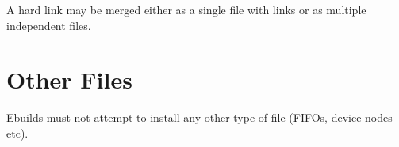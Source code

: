 A hard link may be merged either as a single file with links or as multiple independent files.

\section{Other Files}

Ebuilds must not attempt to install any other type of file (FIFOs, device nodes etc).


